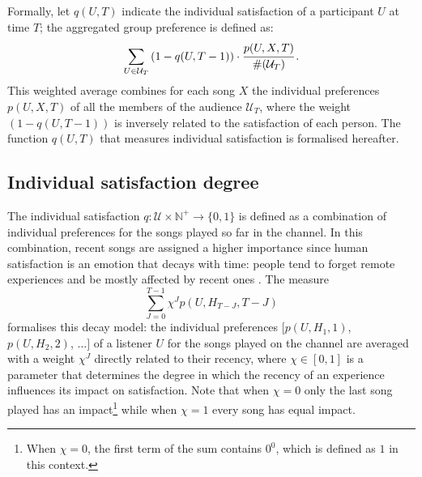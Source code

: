 Formally, let $q(U,T)$ indicate the individual satisfaction of a participant $U$ at time $T$; the aggregated group preference is defined as:
\begin{equation}\label{eq:group_with_misery}
\sum_{U \in \mathcal{U}_T}\left( 1-q(U,T-1) \right) \cdot \cfrac{p(U,X,T)}{\#(\mathcal{U}_T)}\,.        
\end{equation}
This weighted average combines for each song $X$ the individual preferences $p(U,X,T)$ of all the members of the audience $\mathcal{U}_T$, where the weight $(1 - q(U,T-1))$ is inversely related to the satisfaction of each person.
%
The function $q(U,T)$ that measures individual satisfaction is formalised hereafter.



\subsection{Individual satisfaction degree} %
\label{sec:calculating_individual_satisfaction}



The individual satisfaction $q: \mathcal{U} \times \mathbb{N}^+ \to \{0,1\}$ is defined as a combination of individual preferences for the songs played so far in the channel.
In this combination, recent songs are assigned a higher importance since human satisfaction is an emotion that decays with time: people tend to forget remote experiences and be mostly affected by recent ones \cite{Masthoff06}.
The measure
\begin{equation}\label{eq:satisfaction_wrong}
  \sum_{J = 0}^{T-1} \chi^{J} p(U,H_{T-J},T-J)
\end{equation}
formalises this decay model: the individual preferences $[p(U,H_1,1)$, $p(U,H_2,2)$, $\ldots]$ of a listener $U$ for the songs played on the channel are averaged with a weight $\chi^J$ directly related to their recency, where
$\chi \in [0,1]$ is a parameter that determines the degree in which the recency of an experience influences its impact on satisfaction.
Note that when $\chi = 0$ only the last song played has an impact\footnote{When $\chi=0$, the first term of the sum contains $0^0$, which is defined as $1$ in this context.} while when $\chi = 1$ every song has equal impact.


